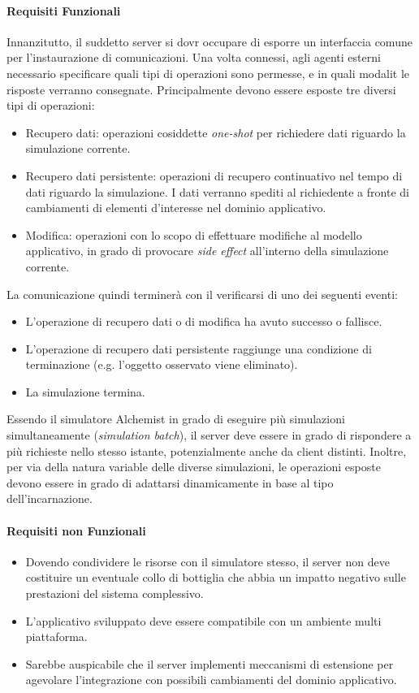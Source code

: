 \paragraph{Requisiti Funzionali} Innanzitutto, il suddetto server si dovr occupare di esporre un interfaccia comune per l'instaurazione
di comunicazioni. Una volta connessi, agli agenti esterni  necessario specificare quali tipi di operazioni sono permesse, e in quali
modalit le risposte verranno consegnate. Principalmente devono essere esposte tre diversi tipi di operazioni:
\begin{itemize}
    \item Recupero dati: operazioni cosiddette \textit{one-shot} per richiedere dati riguardo la simulazione corrente.
    \item Recupero dati persistente: operazioni di recupero continuativo nel tempo di dati riguardo la simulazione. I dati verranno spediti
        al richiedente a fronte di cambiamenti di elementi d'interesse nel dominio applicativo.
    \item Modifica: operazioni con lo scopo di effettuare modifiche al modello applicativo, in grado di provocare \textit{side effect} all'interno
        della simulazione corrente.
\end{itemize}
%
La comunicazione quindi terminerà con il verificarsi di uno dei seguenti eventi:
\begin{itemize}
    \item L'operazione di recupero dati o di modifica ha avuto successo o fallisce.
    \item L'operazione di recupero dati persistente raggiunge una condizione di terminazione (e.g. l'oggetto osservato viene eliminato).
    \item La simulazione termina.
\end{itemize}
%
Essendo il simulatore Alchemist in grado di eseguire più simulazioni simultaneamente (\textit{simulation batch}), il server deve essere in grado
di rispondere a più richieste nello stesso istante, potenzialmente anche da client distinti. Inoltre, per via della natura variable delle diverse
simulazioni, le operazioni esposte devono essere in grado di adattarsi dinamicamente in base al tipo dell'incarnazione.

\paragraph{Requisiti non Funzionali}
\begin{itemize}
    \item Dovendo condividere le risorse con il simulatore stesso, il server non deve costituire un eventuale collo di bottiglia che abbia
        un impatto negativo sulle prestazioni del sistema complessivo.
    \item L'applicativo sviluppato deve essere compatibile con un ambiente multi piattaforma.
    \item Sarebbe auspicabile che il server implementi meccanismi di estensione per agevolare l'integrazione con possibili cambiamenti del dominio applicativo.
\end{itemize}


